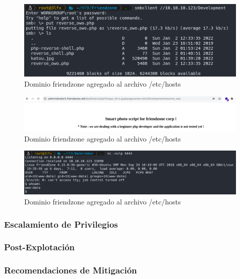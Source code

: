     \begin{figure}[H]
        \centering
        \includegraphics[width=0.99\textwidth]{informe4/imagenes/friendzone/17_reverse_shell_upload.png}
        \caption{Dominio friendzone agregado al archivo /etc/hosts} 
    \end{figure}

    \begin{figure}[H]
        \centering
        \includegraphics[width=0.99\textwidth]{informe4/imagenes/friendzone/18_consult.png}
        \caption{Dominio friendzone agregado al archivo /etc/hosts} 
    \end{figure}

    \begin{figure}[H]
        \centering
        \includegraphics[width=0.99\textwidth]{informe4/imagenes/friendzone/19_conexion_wwwdata.png}
        \caption{Dominio friendzone agregado al archivo /etc/hosts} 
    \end{figure}
    \subsubsection{Escalamiento de Privilegios}

    \subsubsection{Post-Explotación}

    \subsubsection{Recomendaciones de Mitigación}

